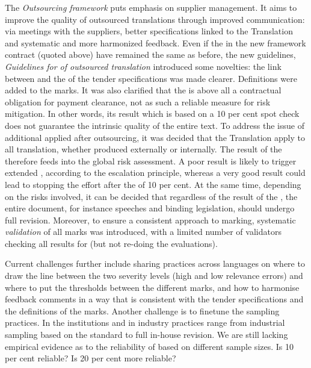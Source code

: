 \documentclass[output=paper]{langsci/langscibook}
\begin{document}
The \textit{ Outsourcing framework} \citep{DGT2016b} puts emphasis on supplier management. It aims to improve the quality of outsourced translations through improved communication: via meetings with the suppliers, better specifications linked to the Translation  and systematic and more harmonized feedback. Even if the  in the new framework contract (quoted above) have remained the same as before, the new  guidelines, \textit{ Guidelines for  of outsourced translation} \citep{DGT2016a} introduced some novelties: the link between  and the  of the tender specifications was made clearer. Definitions were added to the marks. It was also clarified that the  is above all a contractual obligation for payment clearance, not as such a reliable  measure for risk mitigation. In other words, its result which is based on a 10 per cent spot check does not guarantee the intrinsic quality of the entire text. To address the issue of additional  applied after outsourcing, it was decided that the Translation  apply to all translation, whether produced externally or internally. The result of the  therefore feeds into the global risk assessment. A poor  result is likely to trigger extended , according to the escalation principle, whereas a very good result could lead to stopping the effort after the  of 10 per cent. At the same time, depending on the risks involved, it can be decided that regardless of the result of the , the entire document, for instance speeches and binding legislation, should undergo full revision. Moreover, to ensure a consistent approach to marking, systematic \textit{validation} of all marks was introduced, with a limited number of validators checking all  results for  (but not re-doing the evaluations).

Current  challenges further include sharing practices across languages on where to draw the line between the two severity levels (high and low relevance errors) and where to put the thresholds between the different marks, and how to harmonise feedback comments in a way that is consistent with the tender specifications and the definitions of the marks. Another challenge is to finetune the sampling practices. In the  institutions and in industry practices range from industrial sampling based on the \citeauthor{ISO2006} standard to full in-house revision. We are still lacking empirical evidence as to the reliability of  based on different sample sizes. Is 10 per cent reliable? Is 20 per cent more reliable?
\end{document}
